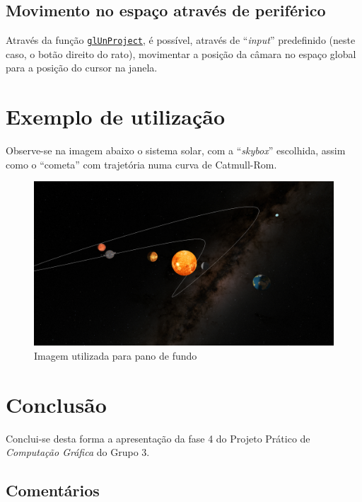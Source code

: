 \documentclass[11pt,a4paper]{report}%
\def\cg{\emph{Computação Gráfica}\xspace}
\begin{document}
\section{Movimento no espaço através de periférico}

Através da função \href{https://www.khronos.org/registry/OpenGL-Refpages/gl2.1/xhtml/gluUnProject.xml}{\texttt{glUnProject}},
é possível, através de ``\textit{input}'' predefinido (neste caso, o botão direito do rato), movimentar a posição
da câmara no espaço global para a posição do cursor na janela.

\chapter{Exemplo de utilização} \label{chap:exemps} %

Observe-se na imagem abaixo o sistema solar, com a ``\textit{skybox}'' escolhida, assim como
o ``cometa'' com trajetória numa curva de Catmull-Rom.

\begin{figure}[H]
  \centering
  \includegraphics[scale=0.4]{exemplo.png}
  \caption{Imagem utilizada para pano de fundo}
  \label{fig:exemplo}
\end{figure}

\chapter{Conclusão} \label{concl}

Conclui-se desta forma a apresentação da fase 4 do Projeto Prático de \cg do Grupo 3.

\section{Comentários}
\end{document}
